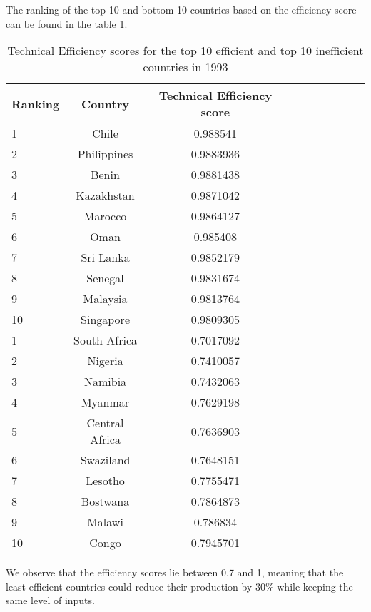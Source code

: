 \documentclass[12pt,a4paper]{article}\usepackage[]{graphicx}\usepackage[]{color}
\begin{document}
The ranking of the top 10 and bottom 10 countries based on the efficiency score can be found in the table \ref{tab:eff.93}.

    \begin{table}[H]
    \label{tab:eff.93}
\centering

\caption{Technical Efficiency scores for the top 10 efficient   and top 10 inefficient countries in 1993}
\begin{tabular}{lccccccccc}
  \hline
 Ranking &Country & Technical Efficiency score\\ 
 
  \hline \hline
   1 & Chile & 0.988541\\ 
   2 & Philippines & 0.9883936   \\ 
   3 & Benin &  0.9881438 \\ 
  4 & Kazakhstan&   0.9871042    \\ 
 5 & Marocco &  0.9864127 \\ 
 6 & Oman & 0.985408\\
 7 & Sri Lanka & 0.9852179 \\
 8 & Senegal  & 0.9831674 \\
 9 & Malaysia & 0.9813764 \\
 10 & Singapore & 0.9809305
 \\
   \hline 

   1 & South Africa& 0.7017092 \\ 
   2 & Nigeria & 0.7410057\\ 
   3 & Namibia &  0.7432063\\ 
   4 &  Myanmar&   0.7629198  \\ 
 5 & Central Africa &  0.7636903 \\ 
 6 & Swaziland & 0.7648151 \\
 7 & Lesotho & 0.7755471\\
 8 & Bostwana  & 0.7864873 \\
 9 & Malawi & 0.786834 \\
 10 & Congo & 0.7945701 \\
   \hline \hline
\end{tabular}

\end{table}

We observe that the efficiency scores lie between 0.7 and 1, meaning that the least efficient countries could reduce their production by 30\% while keeping the same level of inputs.
\end{document}
